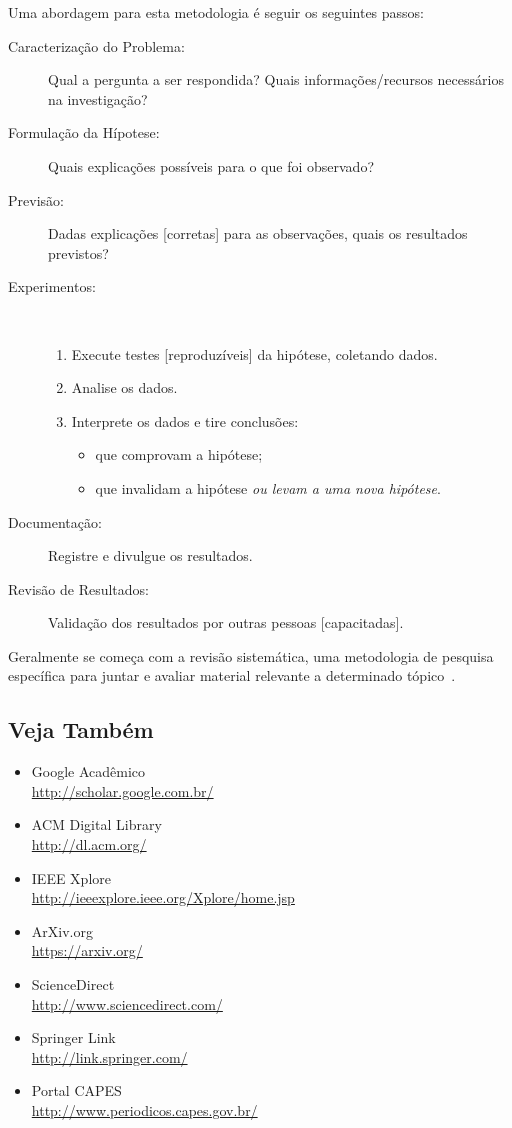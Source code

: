 Uma abordagem para esta metodologia é seguir os seguintes passos:
\begin{description}
	\item[Caracterização do Problema:] Qual a pergunta a ser respondida? Quais informações/recursos 
	necessários na investigação?
	\item[Formulação da Hípotese:] Quais explicações possíveis para o que foi observado?
	\item[Previsão:] Dadas explicações [corretas] para as observações, quais os resultados 
	previstos?
	\item[Experimentos:] \ \\\vspace{-2em}
		\begin{enumerate}
			\item Execute testes [reproduzíveis] da hipótese, coletando dados.
			\item Analise os dados.
			\item Interprete os dados e tire conclusões:
				\begin{itemize}
				\item que comprovam a hipótese;
				\item que invalidam a hipótese \emph{ou levam a uma nova hipótese}.
				\end{itemize}
		\end{enumerate}
	\item[Documentação:] Registre e divulgue os resultados.
	\item[Revisão de Resultados:] Validação dos resultados por outras pessoas [capacitadas].
\end{description}%

Geralmente se começa com a revisão sistemática, uma metodologia de pesquisa específica para juntar 
e avaliar material relevante a determinado tópico~\cite{Biolchini_2005_Systematicreviewin}.

\subsection{Veja Também}
\begin{itemize}
	\item Google Acadêmico
		\\\url{http://scholar.google.com.br/}%
	\item ACM Digital Library
		\\\url{http://dl.acm.org/}%
	\item IEEE Xplore
		\\\url{http://ieeexplore.ieee.org/Xplore/home.jsp}%
	\item ArXiv.org
		\\\url{https://arxiv.org/}%
	\item ScienceDirect
		\\\url{http://www.sciencedirect.com/}%
	\item Springer Link
		\\\url{http://link.springer.com/}%
	\item Portal \acrshort{CAPES}
		\\\url{http://www.periodicos.capes.gov.br/}%
\end{itemize}


